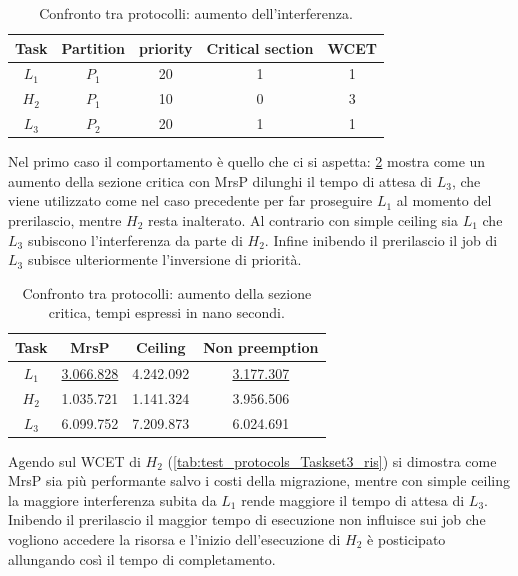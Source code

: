 {  \begin{table}
  \centering
  \begin{tabular}{ccccc}
  \hline\hline
    Task & Partition     & priority & Critical section & WCET  \\ \hline
    $L_1$ & $P_1$  & 20 & 1 & 1 \\
    $H_2$ & $P_1$  & 10 & 0 & 3 \\
    $L_3$ & $P_2$  & 20 & 1 & 1 \\
    \hline
    \end{tabular}
    \caption{Confronto tra protocolli: aumento dell'interferenza.}
  \label{tab:test_protocols_Taskset3}
  \end{table}

\noindent Nel primo caso il comportamento è quello che ci si aspetta: \ref{tab:test_protocols_Taskset2_ris} mostra come un aumento della sezione critica con MrsP dilunghi il tempo di attesa di $L_3$, che viene utilizzato come nel caso precedente per far proseguire $L_1$ al momento del prerilascio, mentre $H_2$ resta inalterato. Al contrario con simple ceiling sia $L_1$ che $L_3$ subiscono l'interferenza da parte di $H_2$. Infine inibendo il prerilascio il job di $L_3$ subisce ulteriormente l'inversione di priorità.\\

\begin{table}
  \centering
  \begin{tabular}{cccc}
  \hline\hline
    Task & MrsP & Ceiling & Non preemption \\ \hline
    $L_1$ & \underline{3.066.828} & 4.242.092 & \underline{3.177.307} \\
    $H_2$ & 1.035.721 & 1.141.324 & 3.956.506 \\
    $L_3$ & 6.099.752 & 7.209.873 & 6.024.691 \\
    \hline
    \end{tabular}
    \caption{Confronto tra protocolli: aumento della sezione critica, tempi espressi in nano secondi.}
  \label{tab:test_protocols_Taskset2_ris}
  \end{table}

\noindent Agendo sul WCET di $H_2$ (\ref{tab:test_protocols_Taskset3_ris}) si dimostra come MrsP sia più performante salvo i costi della migrazione, mentre con simple ceiling la maggiore interferenza subita da $L_1$ rende maggiore il tempo di attesa di $L_3$. Inibendo il prerilascio il maggior tempo di esecuzione non influisce sui job che vogliono accedere la risorsa e l'inizio dell'esecuzione di $H_2$ è posticipato allungando così il tempo di completamento.\\

}

